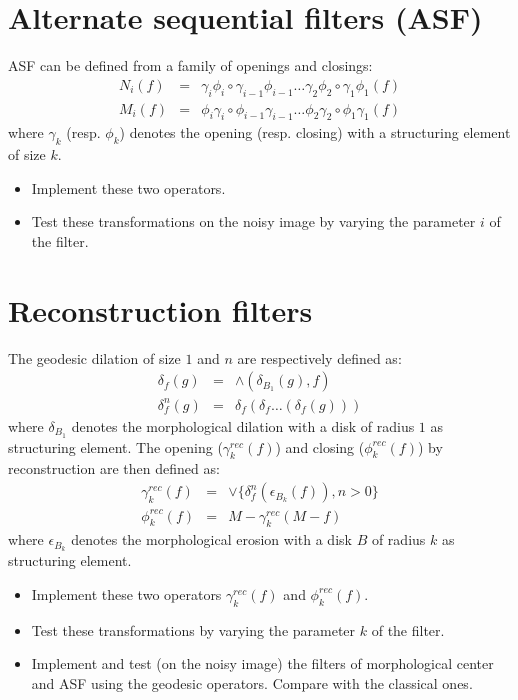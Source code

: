 \section{Alternate sequential filters (ASF)}
ASF can be defined from a family of openings and closings:
\begin{eqnarray}
N_i(f)&=&\gamma_i\phi_i\circ\gamma_{i-1}\phi_{i-1}\dots\gamma_2\phi_2\circ\gamma_1\phi_1(f)\\
M_i(f)&=&\phi_i\gamma_i\circ\phi_{i-1}\gamma_{i-1}\dots\phi_2\gamma_2\circ\phi_1\gamma_1(f)
\end{eqnarray}
where $\gamma_k$ (resp. $\phi_k$) denotes the opening (resp. closing) with a structuring element of size $k$.
\begin{qbox}
\begin{itemize}
	\item Implement these two operators.
	\item Test these transformations on the noisy image by varying the parameter $i$ of the filter.
\end{itemize}
\end{qbox}

\section{Reconstruction filters}
The geodesic dilation of size $1$ and $n$ are respectively defined as:
\begin{eqnarray}
\delta_f(g)&=&\wedge(\delta_{B_1}(g),f)\\
\delta_f^{n}(g)&=&\delta_f(\delta_f\dots(\delta_f(g)))
\end{eqnarray}
where $\delta_{B_1}$ denotes the morphological dilation with a disk of radius $1$ as structuring element.
The opening ($\gamma_k^{rec}(f)$) and closing ($\phi_k^{rec}(f)$) by reconstruction are then defined as:
\begin{eqnarray}
\gamma_k^{rec}(f)&=&\vee\{\delta_f^{n}(\epsilon_{B_k}(f)),n>0\}\\
\phi_k^{rec}(f)&=&M-\gamma_k^{rec}(M-f)
\end{eqnarray}
where $\epsilon_{B_k}$ denotes the morphological erosion with a disk $B$ of radius $k$ as structuring element.
\begin{qbox}
\begin{itemize}
	\item Implement these two operators $\gamma_k^{rec}(f)$ and $\phi_k^{rec}(f)$.
	\item Test these transformations by varying the parameter $k$ of the filter.
	\item Implement and test (on the noisy image) the filters of morphological center and ASF using the geodesic operators. Compare with the classical ones.
\end{itemize}
\end{qbox}
